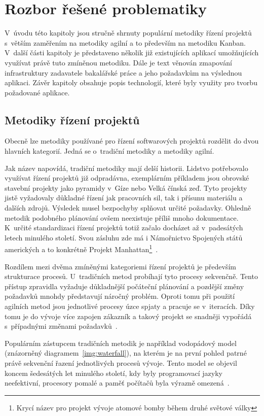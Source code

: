 \chapter{Rozbor řešené problematiky}
V~úvodu této kapitoly jsou stručně shrnuty populární metodiky řízení projektů s~větším zaměřením na metodiky agilní a to především na metodiku Kanban. V~další části kapitoly je představeno několik již existujících aplikací umožňujících využívat právě tuto zmíněnou metodiku. Dále je text věnován zmapování infrastruktury zadavatele bakalářské práce a jeho požadavkům na výslednou aplikaci. Závěr kapitoly obsahuje popis technologií, které byly využity pro tvorbu požadované aplikace.

\section{Metodiky řízení projektů}
Obecně lze metodiky používané pro řízení softwarových projektů rozdělit do dvou hlavních kategorií. Jedná se o~tradiční metodiky a metodiky agilní.

Jak název napovídá, tradiční metodiky mají delší historii. Lidstvo potřebovalo využívat řízení projektů již odpradávna, exemplárním příkladem jsou obrovské stavební projekty jako pyramidy v~Gíze nebo Velká čínská zeď. Tyto projekty jistě vyžadovaly důkladné řízení jak pracovních sil, tak i přísunu materiálu a dalších zdrojů. Výsledek musel bezpochyby splňovat určité požadavky. Ohledně metodik podobného plánování ovšem neexistuje příliš mnoho dokumentace. K~určité standardizaci řízení projektů totiž začalo docházet až v~padesátých letech minulého století. Svou zásluhu zde má i Námořnictvo Spojených států amerických a to konkrétně Projekt Manhattan\footnote{Krycí název pro projekt vývoje atomové bomby během druhé světové války}~\cite{bib:project-managment-history}.

Rozdílem mezi dvěma zmíněnými kategoriemi řízení projektů je především strukturace procesů. U~tradičních metod probíhají tyto procesy sekvenčně. Tento přístup zpravidla vyžaduje důkladnější počáteční plánování a pozdější změny požadavků mnohdy představují náročný problém. Oproti tomu při použití agilních metod jsou jednotlivé procesy úzce spjaty a pracuje se v~iteracích. Díky tomu je do vývoje více zapojen zákazník a takový projekt se snadněji vypořádá s~případnými změnami požadavků~\cite{bib:agile-vs-traditional}. 

Populárním zástupcem tradičních metodik je například vodopádový model (znázorněný diagramem~\ref{img:waterfall}), na kterém je na první pohled patrné právě sekvenční řazení jednotlivých procesů vývoje. Tento model se objevil koncem šedesátých let minulého století, kdy byly programovací jazyky neefektivní, procesory pomalé a paměť počítačů byla výrazně omezená~\cite{bib:agile-history}. 

